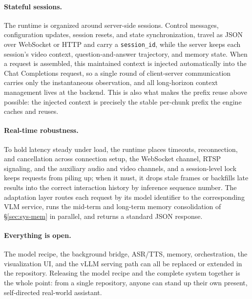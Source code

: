 \documentclass{llmxive}
\begin{document}

\paragraph{\textbf{Stateful sessions.}} The runtime is organized around server-side sessions. Control messages, configuration updates, session resets, and state synchronization, travel as JSON over WebSocket or HTTP and carry a \texttt{session\_id}, while the server keeps each session's video context, question-and-answer trajectory, and memory state. When a request is assembled, this maintained context is injected automatically into the Chat Completions request, so a single round of client-server communication carries only the instantaneous observation, and all long-horizon context management lives at the backend. This is also what makes the prefix reuse above possible: the injected context is precisely the stable per-chunk prefix the engine caches and reuses.

\paragraph{\textbf{Real-time robustness.}} To hold latency steady under load, the runtime places timeouts, reconnection, and cancellation across connection setup, the WebSocket channel, RTSP signaling, and the auxiliary audio and video channels, and a session-level lock keeps requests from piling up; when it must, it drops stale frames or backfills late results into the correct interaction history by inference sequence number. The adaptation layer routes each request by its model identifier to the corresponding VLM service, runs the mid-term and long-term memory consolidation of §\ref{sec:sys-mem} in parallel, and returns a standard JSON response.


\paragraph{\textbf{Everything is open.}} The model recipe, the background bridge, ASR/TTS, memory, orchestration, the visualization UI, and the vLLM serving path can all be replaced or extended in the repository. Releasing the model recipe and the complete system together is the whole point: from a single repository, anyone can stand up their own present, self-directed real-world assistant. 
\end{document}
